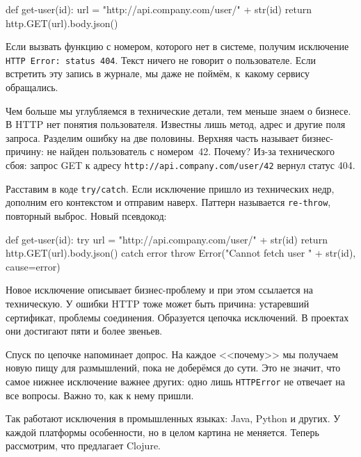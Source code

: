 \begin{english}
  \begin{python}
def get-user(id):
  url = "http://api.company.com/user/" + str(id)
  return http.GET(url).body.json()
  \end{python}
\end{english}

Если вызвать функцию с номером, которого нет в системе, получим исключение
\verb|HTTP Error: status 404|. Текст ничего не говорит о пользователе. Если
встретить эту запись в журнале, мы даже не поймём, к~какому сервису обращались.

Чем больше мы углубляемся в технические детали, тем меньше знаем о бизнесе. В
HTTP нет понятия пользователя. Известны лишь метод, адрес и другие поля
запроса. Разделим ошибку на две половины. Верхняя часть называет бизнес-причину:
не найден пользователь с номером~42. Почему? Из-за технического сбоя: запрос GET
к адресу \verb|http://api.company.com/user/42| вернул статус 404.

Расставим в коде \verb|try/catch|. Если исключение пришло из технических недр,
дополним его контекстом и отправим наверх. Паттерн называется \verb|re-throw|,
повторный выброс. Новый псевдокод:
\begin{english}
  \begin{js}
def get-user(id):
  try {
    url = "http://api.company.com/user/" + str(id)
    return http.GET(url).body.json()
  } catch error {
    throw Error("Cannot fetch user " + str(id), cause=error)
  }
  \end{js}
\end{english}


Новое исключение описывает бизнес-проблему и при этом ссылается на
техническую. У ошибки HTTP тоже может быть причина: устаревший сертификат,
проблемы соединения. Образуется цепочка исключений. В проектах они достигают
пяти и более звеньев.

Спуск по цепочке напоминает допрос. На каждое <<почему>> мы получаем новую пищу
для размышлений, пока не доберёмся до сути. Это не значит, что самое нижнее
исключение важнее других: одно лишь \verb|HTTPError| не отвечает на все
вопросы. Важно то, как к нему пришли.

Так работают исключения в промышленных языках: Java, Python и других. У каждой
платформы особенности, но в целом картина не меняется. Теперь рассмотрим, что
предлагает Clojure.

